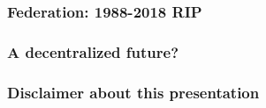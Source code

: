 \documentclass[aspectratio=169]{beamer}
\begin{document}

\begin{frame}
\frametitle{Federation: 1988-2018 RIP}
\end{frame}

\begin{frame}
\frametitle{A decentralized future?}
\end{frame}

\begin{frame}
\frametitle{Disclaimer about this presentation}
\end{frame}

\subtitle{Thank you}
\frame[plain]{\titlepage}
\end{document}
